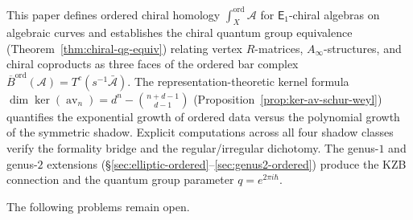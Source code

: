 \documentclass[11pt,reqno]{amsart}
\theoremstyle{definition}
\theoremstyle{remark}
\newcommand{\cA}{\mathcal{A}}
\newcommand{\Ainf}{A_{\infty}}
\newcommand{\Eone}{\mathsf{E}_{1}}
\DeclareMathOperator{\av}{av}
\newcommand{\Barord}{\overline{B}^{\mathrm{ord}}}
\numberwithin{equation}{section}
\begin{document}
This paper defines ordered chiral homology
$\int_X^{\mathrm{ord}} \cA$ for $\Eone$-chiral algebras
on algebraic curves and establishes the chiral quantum
group equivalence (Theorem~\ref{thm:chiral-qg-equiv})
relating vertex $R$-matrices, $\Ainf$-structures, and
chiral coproducts as three faces of the ordered bar complex
$\Barord(\cA) = T^c(s^{-1}\bar{\cA})$.
The representation-theoretic kernel formula
$\dim\ker(\av_n) = d^n - \binom{n+d-1}{d-1}$
(Proposition~\ref{prop:ker-av-schur-weyl}) quantifies the
exponential growth of ordered data versus the polynomial
growth of the symmetric shadow.
Explicit computations across all four shadow classes verify
the formality bridge and the regular/irregular dichotomy.
The genus-$1$ and genus-$2$ extensions
(\S\ref{sec:elliptic-ordered}--\ref{sec:genus2-ordered})
produce the KZB connection and the quantum group parameter
$q = e^{2\pi i \hbar}$.

The following problems remain open.
\end{document}
